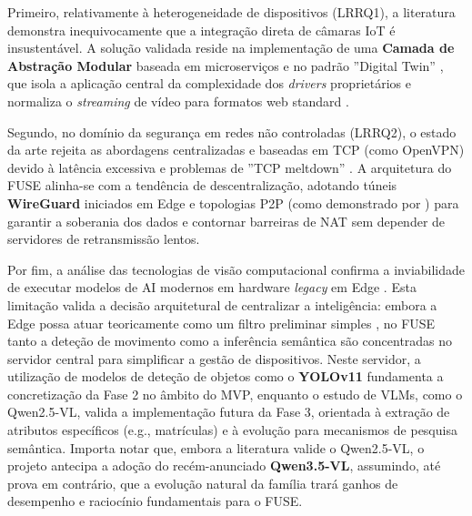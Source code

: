 Primeiro, relativamente à heterogeneidade de dispositivos (LRRQ1), a literatura \cite{barros_iot_2019,mesmoudi_design_2018} demonstra inequivocamente que a integração direta de câmaras \gls{IoT} é insustentável. A solução validada reside na implementação de uma \textbf{Camada de Abstração Modular} baseada em microserviços e no padrão ''Digital Twin'' \cite{mafamane_study_2021}, que isola a aplicação central da complexidade dos \textit{drivers} proprietários e normaliza o \textit{streaming} de vídeo para formatos web standard \cite{schwarzer_ial_2021}.

Segundo, no domínio da segurança em redes não controladas (LRRQ2), o estado da arte rejeita as abordagens centralizadas e baseadas em \gls{TCP} (como OpenVPN) devido à latência excessiva e problemas de ''TCP meltdown'' \cite{asim_sect_2025}. A arquitetura do \gls{FUSE} alinha-se com a tendência de descentralização, adotando túneis \textbf{WireGuard} iniciados em Edge \cite{hohmann_bridge_2021,bezenk_remote_2024} e topologias \gls{P2P} (como demonstrado por \cite{tong_daiottalk_2025}) para garantir a soberania dos dados e contornar barreiras de \gls{NAT} sem depender de servidores de retransmissão lentos.

Por fim, a análise das tecnologias de visão computacional confirma a inviabilidade de executar modelos de \gls{AI} modernos em hardware \textit{legacy} em Edge \cite{bai_decade_2025,pecolt_personal_2025}. Esta limitação valida a decisão arquitetural de centralizar a inteligência: embora a Edge possa atuar teoricamente como um filtro preliminar simples \cite{sultana_iot-guard_2019}, no \gls{FUSE} tanto a deteção de movimento como a inferência semântica são concentradas no servidor central para simplificar a gestão de dispositivos. Neste servidor, a utilização de modelos de deteção de objetos como o \textbf{YOLOv11} fundamenta a concretização da Fase 2 no âmbito do \gls{MVP}, enquanto o estudo de \glspl{VLM}, como o Qwen2.5-VL, valida a implementação futura da Fase 3, orientada à extração de atributos específicos (e.g., matrículas) e à evolução para mecanismos de pesquisa semântica. Importa notar que, embora a literatura valide o Qwen2.5-VL, o projeto antecipa a adoção do recém-anunciado \textbf{Qwen3.5-VL}, assumindo, até prova em contrário, que a evolução natural da família trará ganhos de desempenho e raciocínio fundamentais para o \gls{FUSE}.
